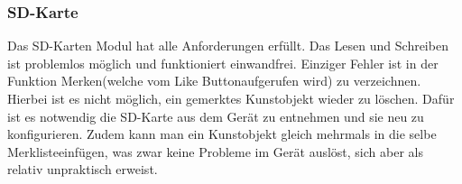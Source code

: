\subsubsection{SD-Karte}
Das SD-Karten Modul hat alle Anforderungen erfüllt. Das Lesen und Schreiben ist problemlos möglich und funktioniert einwandfrei. Einziger Fehler ist in der Funktion \glqq Merken\grqq (welche vom \glqq Like Button\grqq aufgerufen wird) zu verzeichnen. Hierbei ist es nicht möglich, ein gemerktes Kunstobjekt wieder zu löschen. Dafür ist es notwendig die SD-Karte aus dem Gerät zu entnehmen und sie neu zu konfigurieren. Zudem kann man ein Kunstobjekt gleich mehrmals in die selbe \glqq Merkliste\grqq einfügen, was zwar keine Probleme im Gerät auslöst, sich aber als relativ unpraktisch erweist.


